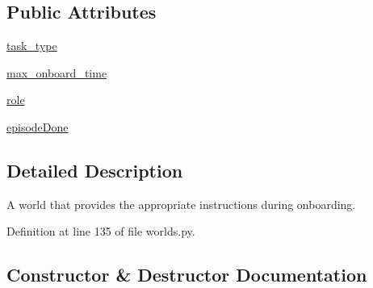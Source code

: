 \subsection*{Public Attributes}
\begin{DoxyCompactItemize}
\item 
\hyperlink{classparlai_1_1mturk_1_1tasks_1_1wizard__of__wikipedia_1_1worlds_1_1RoleOnboardWorld_a9a12f1f9c3e0648d520b5a60103026e2}{task\+\_\+type}
\item 
\hyperlink{classparlai_1_1mturk_1_1tasks_1_1wizard__of__wikipedia_1_1worlds_1_1RoleOnboardWorld_a52544620386fc0dee8de4c1e28223281}{max\+\_\+onboard\+\_\+time}
\item 
\hyperlink{classparlai_1_1mturk_1_1tasks_1_1wizard__of__wikipedia_1_1worlds_1_1RoleOnboardWorld_a23e9dabe75318cc16b819f1868026a71}{role}
\item 
\hyperlink{classparlai_1_1mturk_1_1tasks_1_1wizard__of__wikipedia_1_1worlds_1_1RoleOnboardWorld_a37cf10b9e972e9de5dae2191cbe46c2b}{episode\+Done}
\end{DoxyCompactItemize}


\subsection{Detailed Description}
\begin{DoxyVerb}A world that provides the appropriate instructions during onboarding.
\end{DoxyVerb}
 

Definition at line 135 of file worlds.\+py.



\subsection{Constructor \& Destructor Documentation}
\mbox{\label{classparlai_1_1mturk_1_1tasks_1_1wizard__of__wikipedia_1_1worlds_1_1RoleOnboardWorld_acd0e219bbdd512e859e259bbb8c8cb6a}} 

